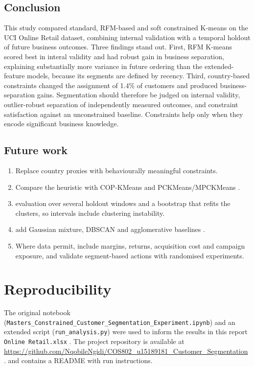 \documentclass[conference,10pt]{IEEEtran}
\begin{document}
\subsection{Conclusion}
This study compared standard, RFM-based and soft constrained K-means on the
UCI Online Retail dataset, combining internal validation with a temporal
holdout of future business outcomes. Three findings stand out. First, RFM
K-means scored best in interal validity and had robust gain in business separation, explaining substantially
more variance in future ordering than the extended-feature models, because
its segments are defined by recency. Third, country-based constraints changed
the assignment of 1.4\% of customers and produced business-separation gains. Segmentation should therefore be
judged on internal validity, outlier-robust separation of
independently measured outcomes, and constraint satisfaction against an
unconstrained baseline. Constraints help only when they encode significant business knowledge.

\subsection{Future work}
\begin{enumerate}
  \item Replace country proxies with behaviourally meaningful constraints.
  \item Compare the heuristic with COP-KMeans \cite{wagstaff2001constrained}
  and PCKMeans/MPCKMeans \cite{basu2004probabilistic}.
  \item evaluation over several holdout windows and a
  bootstrap that refits the clusters, so intervals include clustering
  instability.
  \item add Gaussian mixture, DBSCAN and agglomerative baselines
  \cite{john2023exploration,wani2024comprehensive}.

  \item Where data permit, include margins, returns, acquisition cost and
  campaign exposure, and validate segment-based actions with randomised
  experiments.
\end{enumerate}

\section*{Reproducibility }
The original notebook
(\texttt{Masters\_Constrained\_\allowbreak Customer\_\allowbreak Segmentation\_\allowbreak Experiment.ipynb})
and an extended script (\texttt{run\_analysis.py}) were used to inform the results in this report \texttt{Online Retail.xlsx} . The project repository is available at
\url{https://github.com/NqobileNgidi/COS802_u15189181_Customer_Segmentation}
.
and contains a README with run instructions.
\end{document}
